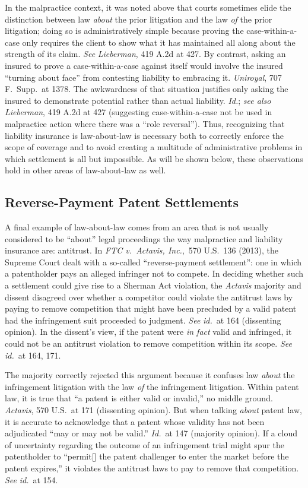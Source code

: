 \documentclass[
  12pt,
  letterpaper,
]{scrartcl}
\begin{document}
In the malpractice context, it was noted above that courts sometimes elide the
distinction between law \textit{about} the prior litigation and the law
\textit{of} the prior litigation; doing so is administratively simple because
proving the case-within-a-case only requires the client to show what it has
maintained all along about the strength of its claim. \textit{See}
\textit{Lieberman}, 419 A.2d at 427. By contrast, asking an insured to prove a
case-within-a-case against itself would involve the insured ``turning about
face'' from contesting liability to embracing it. \textit{Uniroyal}, 707
F.~Supp.~at 1378. The awkwardness of that situation justifies only asking the
insured to demonstrate potential rather than actual liability. \textit{Id.};
\textit{see also} \textit{Lieberman}, 419 A.2d at 427 (suggesting
case-within-a-case not be used in malpractice action where there was a ``role
reversal''). Thus, recognizing that liability insurance is law-about-law is
necessary both to correctly enforce the scope of coverage and to avoid creating
a multitude of administrative problems in which settlement is all but
impossible. As will be shown below, these observations hold in other areas of
law-about-law as well.


\subsection{Reverse-Payment Patent Settlements}

A final example of law-about-law comes from an area that is not usually
considered to be ``about'' legal proceedings the way malpractice and liability
insurance are: antitrust. In \textit{FTC v.~Actavis, Inc.},~570 U.S.~136
(2013), the Supreme Court dealt with a so-called ``reverse-payment
settlement'': one in which a patentholder pays an alleged infringer not to
compete. In deciding whether such a settlement could give rise to a Sherman Act
violation, the \textit{Actavis} majority and dissent disagreed over whether a
competitor could violate the antitrust laws by paying to remove competition
that might have been precluded by a valid patent had the infringement suit
proceeded to judgment. \textit{See} \textit{id.}~at 164 (dissenting opinion).
In the dissent's view, if the patent were \emph{in fact} valid and infringed,
it could not be an antitrust violation to remove competition within its scope.
\textit{See} \textit{id.}~at 164, 171.

The majority correctly rejected this argument because it confuses law
\textit{about} the infringement litigation with the law \textit{of} the
infringement litigation. Within patent law, it is true that ``a patent is
either valid or invalid,'' no middle ground. \textit{Actavis}, 570 U.S.~at 171
(dissenting opinion). But when talking \textit{about} patent law, it is
accurate to acknowledge that a patent whose validity has not been adjudicated
``may or may not be valid.'' \textit{Id.}~at 147 (majority opinion). If a cloud
of uncertainty regarding the outcome of an infringement trial might spur the
patentholder to ``permit[] the patent challenger to enter the market before the
patent expires,'' it violates the antitrust laws to pay to remove that
competition. \textit{See} \textit{id.}~at 154.
\end{document}

